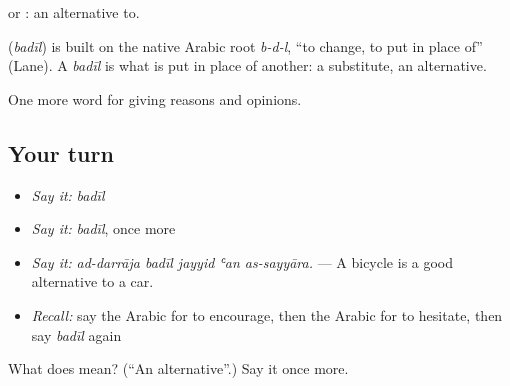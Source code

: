   or  : an alternative to.

\begin{cousinweb}
\textbf{} (\emph{badīl}) is built on the native Arabic root \emph{b-d-l}, \textquotedblleft{}to change, to put in place of\textquotedblright{} (Lane). A \emph{badīl} is what is put in place of another: a substitute, an alternative.
\end{cousinweb}

\begin{grammarlens}[title={What you've built}]
One more word for giving reasons and opinions.
\end{grammarlens}

\subsection*{Your turn}
\begin{itemize}
\raggedright
  \item \emph{Say it:} \emph{badīl}
  \item \emph{Say it:} \emph{badīl}, once more
  \item \emph{Say it:} \emph{ad-darrāja badīl jayyid ʿan as-sayyāra.} — A bicycle is a good alternative to a car.
  \item \emph{Recall:} say the Arabic for to encourage, then the Arabic for to hesitate, then say \emph{badīl} again
\end{itemize}

\begin{tcolorbox}[breakable,colback=teal!4,colframe=teal!35!black,title={Before you move on}]
What does  mean? (\textquotedblleft{}An alternative\textquotedblright{}.) Say it once more.
\end{tcolorbox}
